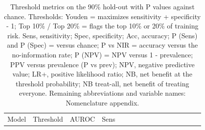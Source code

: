 \documentclass[
  11pt,
]{article}
\begin{document}
\begin{longtable}[]{@{}
  >{\raggedright\arraybackslash}p{}
  >{\raggedright\arraybackslash}p{}
  >{\raggedright\arraybackslash}p{}
  >{\raggedright\arraybackslash}p{}
  >{\raggedright\arraybackslash}p{}
  >{\raggedright\arraybackslash}p{}
  >{\raggedright\arraybackslash}p{}
  >{\raggedright\arraybackslash}p{}
  >{\raggedright\arraybackslash}p{}
  >{\raggedright\arraybackslash}p{}
  >{\raggedright\arraybackslash}p{}
  >{\raggedright\arraybackslash}p{}
  >{\raggedright\arraybackslash}p{}
  >{\raggedright\arraybackslash}p{}
  >{\raggedright\arraybackslash}p{}
  >{\raggedright\arraybackslash}p{}@{}}
\caption{Threshold metrics on the 90\% hold-out with P values against
chance. Thresholds: Youden = maximizes sensitivity + specificity - 1;
Top 10\% / Top 20\% = flags the top 10\% or 20\% of training risk. Sens,
sensitivity; Spec, specificity; Acc, accuracy; P (Sens) and P (Spec) =
versus chance; P vs NIR = accuracy versus the no-information rate; P
(NPV) = NPV versus 1 - prevalence; PPV versus prevalence (P vs prev);
NPV, negative predictive value; LR+, positive likelihood ratio; NB, net
benefit at the threshold probability; NB treat-all, net benefit of
treating everyone. Remaining abbreviations and variable names:
Nomenclature appendix.}\tabularnewline
\toprule\noalign{}
\begin{minipage}[b]{\linewidth}\raggedright
Model
\end{minipage} & \begin{minipage}[b]{\linewidth}\raggedright
Threshold
\end{minipage} & \begin{minipage}[b]{\linewidth}\raggedright
AUROC
\end{minipage} & \begin{minipage}[b]{\linewidth}\raggedright
Sens
\end{minipage} & \begin{minipage}[b]{\linewidth}\raggedright

\end{minipage}
\end{longtable}
\end{document}

